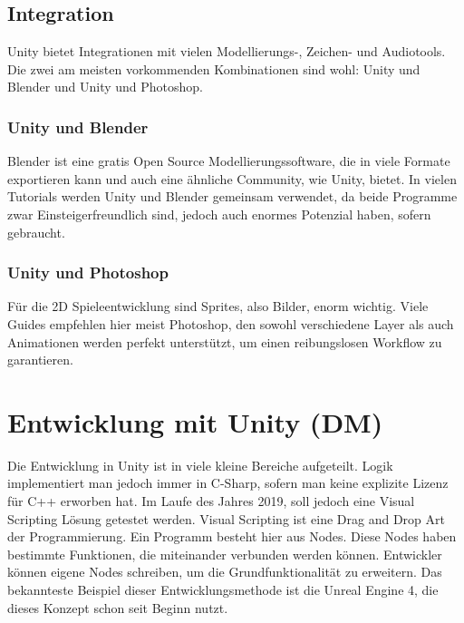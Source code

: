 \subsection{Integration}
Unity bietet Integrationen mit vielen Modellierungs-, Zeichen- und Audiotools. Die zwei am meisten vorkommenden Kombinationen sind wohl: Unity und Blender und Unity und Photoshop.
\subsubsection{Unity und Blender} \label{sec:unity-blender}
Blender ist eine gratis Open Source Modellierungssoftware, die in viele Formate exportieren kann und auch eine ähnliche Community, wie Unity, bietet. In vielen Tutorials werden Unity und Blender gemeinsam verwendet, da beide Programme zwar Einsteigerfreundlich sind, jedoch auch enormes Potenzial haben, sofern gebraucht. 
\subsubsection{Unity und Photoshop}
Für die 2D Spieleentwicklung sind Sprites, also Bilder, enorm wichtig. Viele Guides empfehlen hier meist Photoshop, den sowohl verschiedene Layer als auch Animationen werden perfekt unterstützt, um einen reibungslosen Workflow zu garantieren.

\section{Entwicklung mit Unity (DM)}
Die Entwicklung in Unity ist in viele kleine Bereiche aufgeteilt. Logik implementiert man jedoch immer in C-Sharp, sofern man keine explizite Lizenz für C++ erworben hat. Im Laufe des Jahres 2019, soll jedoch eine Visual Scripting Lösung getestet werden. Visual Scripting ist eine Drag and Drop Art der Programmierung. Ein Programm besteht hier aus Nodes. Diese Nodes haben bestimmte Funktionen, die miteinander verbunden werden können. Entwickler können eigene Nodes schreiben, um die Grundfunktionalität zu erweitern. Das bekannteste Beispiel dieser Entwicklungsmethode ist die Unreal Engine 4, die dieses Konzept schon seit Beginn nutzt. 
